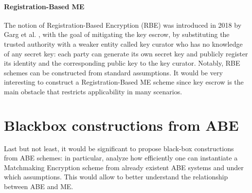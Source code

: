 \paragraph{Registration-Based ME}
The notion of Registration-Based Encryption (RBE) was introduced in 2018 by Garg et al. \cite{Garg}, with the goal of mitigating the key escrow, by substituting the trusted authority with a weaker entity called key curator who has no knowledge of any secret key: each party can generate its own secret key and publicly register its identity and the corresponding public key to the key curator. Notably, RBE schemes can be constructed from standard assumptions.
It would be very interesting to construct a Registration-Based ME scheme since key escrow is the main obstacle that restricts applicability in many scenarios.

\section{Blackbox constructions from ABE}
Last but not least, it would be significant to propose black-box constructions from ABE schemes: in particular, analyze how efficiently one can instantiate a Matchmaking Encryption scheme from already existent ABE systems and under which assumptions.
This would allow to better understand the relationship between ABE and ME.
